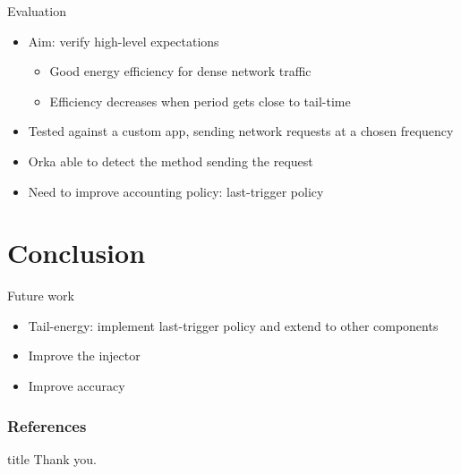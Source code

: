 \begin{frame}[fragile]{Evaluation}
\begin{itemize}
\item Aim: verify high-level expectations
\begin{itemize}
\item Good energy efficiency for dense network traffic
\item Efficiency decreases when period gets close to tail-time
\end{itemize}
\item Tested against a custom app, sending network requests at a chosen frequency
\item Orka able to detect the method sending the request
\item Need to improve accounting policy: \alert{last-trigger policy}
\end{itemize}
\end{frame}
%
%
%
\section{Conclusion}
\begin{frame}{Future work}
\begin{itemize}
\item Tail-energy: implement last-trigger policy and extend to other components
\item Improve the injector
\item Improve accuracy
\end{itemize}
\end{frame}
%
%
\begin{frame}[allowframebreaks]
        \frametitle{References}
        
        {\footnotesize  }
\end{frame}
%
%
\begin{frame}
  \vfill
  \centering
  \begin{beamercolorbox}[sep=8pt,center,shadow=true,rounded=true]{title}
    Thank you.\par%
  \end{beamercolorbox}
  \vfill
\end{frame}
%
%
